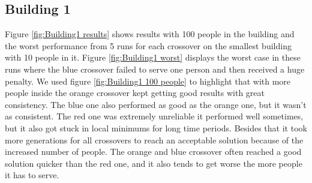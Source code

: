 \subsection{Building 1}
Figure \ref{fig:Building1 results} shows results with 100 people in the building and the worst performance from 5 runs for each crossover on the smallest building with 10 people in it. Figure \ref{fig:Building1 worst} displays the worst case in these runs where the blue crossover failed to serve one person and then received a huge penalty. We used figure \ref{fig:Building1 100 people} to highlight that with more people inside the orange crossover kept getting good results with great consistency. The blue one also performed as good as the orange one, but it wasn't as consistent. The red one was extremely unreliable it performed well sometimes, but it also got stuck in local minimums for long time periods. Besides that it took more generations for all crossovers to reach an acceptable solution because of the increased number of people. The orange and blue crossover often reached a good solution quicker than the red one, and it also tends to get worse the more people it has to serve.

